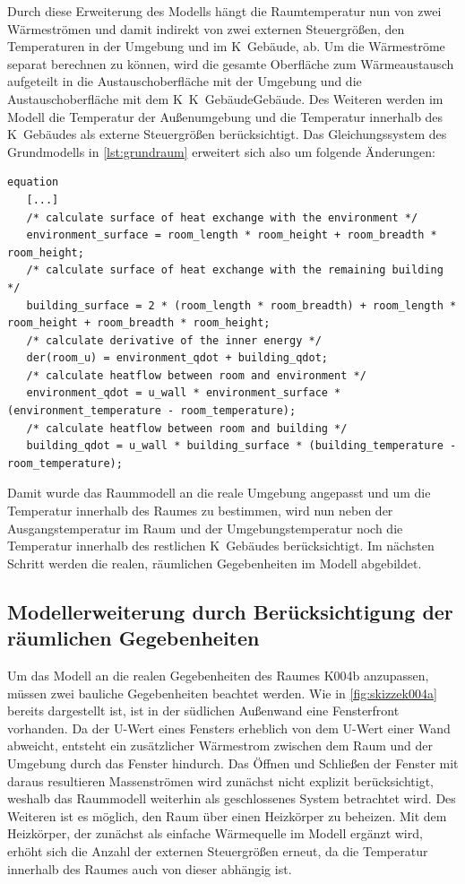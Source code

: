 Durch diese Erweiterung des Modells hängt die Raumtemperatur nun von zwei Wärmeströmen und damit indirekt von zwei externen Steuergrößen, den Temperaturen in der Umgebung und im K~Gebäude, ab. Um die Wärmeströme separat berechnen zu können, wird die gesamte Oberfläche zum Wärmeaustausch aufgeteilt in die Austauschoberfläche mit der Umgebung und die Austauschoberfläche mit dem K~K~GebäudeGebäude. Des Weiteren werden im Modell die Temperatur der Außenumgebung und die Temperatur innerhalb des K~Gebäudes als externe Steuergrößen berücksichtigt. Das Gleichungssystem des Grundmodells in \ref{lst:grundraum} erweitert sich also um folgende Änderungen:

\begin{lstlisting}[language=Modelica, caption={Erweitertes Gleichungssystem Modell des Raumes unter Berücksichtigung der realen Umgebung in Modelica}, label=lst:raumeins]
equation
   [...]
   /* calculate surface of heat exchange with the environment */
   environment_surface = room_length * room_height + room_breadth * room_height;
   /* calculate surface of heat exchange with the remaining building */
   building_surface = 2 * (room_length * room_breadth) + room_length * room_height + room_breadth * room_height;
   /* calculate derivative of the inner energy */
   der(room_u) = environment_qdot + building_qdot;
   /* calculate heatflow between room and environment */
   environment_qdot = u_wall * environment_surface * (environment_temperature - room_temperature);
   /* calculate heatflow between room and building */
   building_qdot = u_wall * building_surface * (building_temperature - room_temperature);
\end{lstlisting}

Damit wurde das Raummodell an die reale Umgebung angepasst und um die Temperatur innerhalb des Raumes zu bestimmen, wird nun neben der Ausgangstemperatur im Raum und der Umgebungstemperatur noch die Temperatur innerhalb des restlichen K~Gebäudes berücksichtigt. Im nächsten Schritt werden die realen, räumlichen Gegebenheiten im Modell abgebildet.


\subsection{Modellerweiterung durch Berücksichtigung der räumlichen Gegebenheiten}

Um das Modell an die realen Gegebenheiten des Raumes K004b anzupassen, müssen zwei bauliche Gegebenheiten beachtet werden. Wie in \ref{fig:skizzek004a} bereits dargestellt ist, ist in der südlichen Außenwand eine Fensterfront vorhanden. Da der U-Wert eines Fensters erheblich von dem U-Wert einer Wand abweicht, entsteht ein zusätzlicher Wärmestrom zwischen dem Raum und der Umgebung durch das Fenster hindurch. Das Öffnen und Schließen der Fenster mit daraus resultieren Massenströmen wird zunächst nicht explizit berücksichtigt, weshalb das Raummodell weiterhin als geschlossenes System betrachtet wird. Des Weiteren ist es möglich, den Raum über einen Heizkörper zu beheizen. Mit dem Heizkörper, der zunächst als einfache Wärmequelle im Modell ergänzt wird, erhöht sich die Anzahl der externen Steuergrößen erneut, da die Temperatur innerhalb des Raumes auch von dieser abhängig ist.

